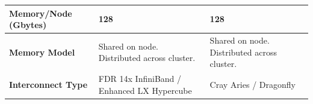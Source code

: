 \documentclass[gmd, manuscript]{copernicus}
\begin{document}
\begin{table}[]
\begin{tabular}{|l|l|l|}
\textbf{Memory/Node (Gbytes)}            & 128                                         & 128                                         \\ \hline
\textbf{Memory Model}                    & Shared on node. Distributed across cluster. & Shared on node. Distributed across cluster. \\ \hline
\textbf{Interconnect Type}               & FDR 14x InfiniBand / Enhanced LX Hypercube  & Cray Aries / Dragonfly                      \\ \hline
\end{tabular}
\end{table}
%
%
%
%
%
%
%
%
%
%
%
%
%
%
%
\end{document}
